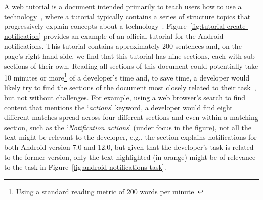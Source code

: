 A web tutorial is a document intended primarily to teach users how to use 
a technology~\cite{arya2020}, where  
a tutorial typically contains a series of structure topics 
that progressively explain concepts about a technology~\cite{Jiang2016b, Jiang2017}. 
Figure~\ref{fig:tutorial-create-notification} provides an example 
of an official tutorial for the Android notifications. 
This tutorial contains  approximately 200 sentences
and, on the page's right-hand side, we find that this tutorial
has nine sections, each with sub-sections of their own. 
Reading all sections of this document could potentially 
take 10 minutes or more\footnote{Using a standard reading metric of 200 words per minute~\cite{Just1980}} of a developer's time 
and, to save time, a developer would likely try to find the sections of the document
most closely related to their task~\cite{Li2013}, but not without challenges.
For example, using a web browser's search to find content that mentions the `\textit{actions}' keyword, 
a developer would find eight different matches spread across four different sections
and even within a matching section, 
such as the `\textit{Notification actions}'
 (under focus in the figure), 
not all the text might be relevant to 
the developer, e.g.,
the section explains 
notifications for both Android version 7.0 and 12.0, 
 but given that the developer's task is related to the former version,
only the text highlighted (in orange)
might be of relevance to the task in Figure~\ref{fig:android-notifications-task}.





